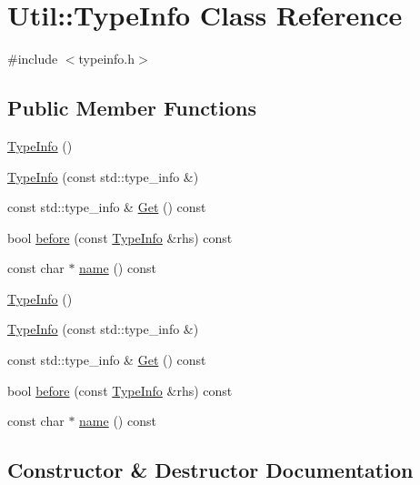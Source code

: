 \hypertarget{classUtil_1_1TypeInfo}{}\section{Util\+:\+:Type\+Info Class Reference}
\label{classUtil_1_1TypeInfo}


{\ttfamily \#include $<$typeinfo.\+h$>$}

\subsection*{Public Member Functions}
\begin{DoxyCompactItemize}
\item 
\mbox{\hyperlink{classUtil_1_1TypeInfo_a27c20c8fb4cee4c6af25901aa86c2c8e}{Type\+Info}} ()
\item 
\mbox{\hyperlink{classUtil_1_1TypeInfo_a71cf2dcfbc30380d9fcd866b1d685f34}{Type\+Info}} (const std\+::type\+\_\+info \&)
\item 
const std\+::type\+\_\+info \& \mbox{\hyperlink{classUtil_1_1TypeInfo_ad5aa0be0eb3620266822b8c55bd43ce7}{Get}} () const
\item 
bool \mbox{\hyperlink{classUtil_1_1TypeInfo_a016c2263e881e81b956718c6571ac637}{before}} (const \mbox{\hyperlink{classUtil_1_1TypeInfo}{Type\+Info}} \&rhs) const
\item 
const char $\ast$ \mbox{\hyperlink{classUtil_1_1TypeInfo_a0b8817efd5836d63f3d2ac808858dadb}{name}} () const
\item 
\mbox{\hyperlink{classUtil_1_1TypeInfo_a27c20c8fb4cee4c6af25901aa86c2c8e}{Type\+Info}} ()
\item 
\mbox{\hyperlink{classUtil_1_1TypeInfo_a71cf2dcfbc30380d9fcd866b1d685f34}{Type\+Info}} (const std\+::type\+\_\+info \&)
\item 
const std\+::type\+\_\+info \& \mbox{\hyperlink{classUtil_1_1TypeInfo_af201eec5ca4934cd5d8312d6458ec605}{Get}} () const
\item 
bool \mbox{\hyperlink{classUtil_1_1TypeInfo_a016c2263e881e81b956718c6571ac637}{before}} (const \mbox{\hyperlink{classUtil_1_1TypeInfo}{Type\+Info}} \&rhs) const
\item 
const char $\ast$ \mbox{\hyperlink{classUtil_1_1TypeInfo_ae6ca4a05f56329034b44fff495170737}{name}} () const
\end{DoxyCompactItemize}


\subsection{Constructor \& Destructor Documentation}
\mbox{\label{classUtil_1_1TypeInfo_a27c20c8fb4cee4c6af25901aa86c2c8e}} 
